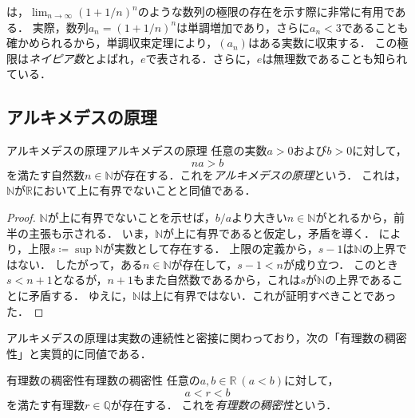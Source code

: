 は，$\lim_{n \to \infty} (1+1/n)^n$のような数列の極限の存在を示す際に非常に有用である．
実際，数列$a_n = (1+1/n)^n$は単調増加であり，さらに$a_n < 3$であることも確かめられるから，単調収束定理により，$(a_n)$はある実数に収束する．
この極限は\emph{ネイピア数}とよばれ，$e$で表される．さらに，$e$は無理数であることも知られている．

\subsection{アルキメデスの原理}

\begin{theorem}{アルキメデスの原理}{アルキメデスの原理}
  任意の実数$a > 0$および$b > 0$に対して，
  \[
    na > b
  \]
  を満たす自然数$n \in \mathbb{N}$が存在する．これを\emph{アルキメデスの原理}という．
  これは，$\mathbb{N}$が$\mathbb{R}$において上に有界でないことと同値である．
\end{theorem}

\begin{tleftbar}
  \begin{proof}
    $\mathbb{N}$が上に有界でないことを示せば，$b/a$より大きい$n \in \mathbb{N}$がとれるから，前半の主張も示される．
    いま，$\mathbb{N}$が上に有界であると仮定し，矛盾を導く．
    により，上限$s \coloneqq \sup \mathbb{N}$が実数として存在する．
    上限の定義から，$s-1$は$\mathbb{N}$の上界ではない．
    したがって，ある$n \in \mathbb{N}$が存在して，$s-1 < n$が成り立つ．
    このとき$s < n+1$となるが，$n+1$もまた自然数であるから，これは$s$が$\mathbb{N}$の上界であることに矛盾する．
    ゆえに，$\mathbb{N}$は上に有界ではない．これが証明すべきことであった．
  \end{proof}
\end{tleftbar}

アルキメデスの原理は実数の連続性と密接に関わっており，次の「有理数の稠密性」と実質的に同値である．

\begin{theorem}{有理数の稠密性}{有理数の稠密性}
  任意の$a,b \in \mathbb{R}~(a < b)$に対して，
  \[
    a < r < b
  \]
  を満たす有理数$r \in \mathbb{Q}$が存在する．
  これを\emph{有理数の稠密性}という．
\end{theorem}



